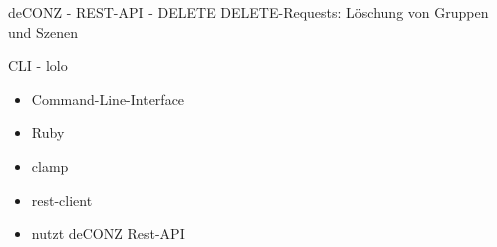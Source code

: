 \begin{frame}{deCONZ - REST-API - DELETE}
  \Large
  DELETE-Requests: Löschung
  \flushleft
  von Gruppen und Szenen
\end{frame}

\begin{frame}{}
  \begin{center}
    \vspace{-0.2cm}
    \label{fig:disaster}
  \end{center}
\end{frame}

\begin{frame}{CLI - lolo}
  \Large
  \begin{itemize}
    \item Command-Line-Interface
    \item Ruby
    \item clamp
    \item rest-client
    \item nutzt deCONZ Rest-API
  \end{itemize}
\end{frame}